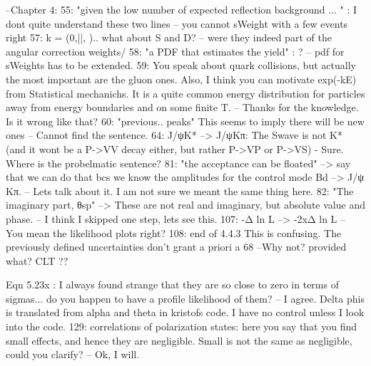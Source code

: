 --Chapter 4:
55: "given the low number of expected reflection background ... " : I dont quite understand these two lines
    -- you cannot sWeight with a few events right
57: k = (0,||, \perp).. what about S and D?
    -- were they indeed part of the angular correction weights/
58: "a PDF that estimates the yield" : ?
    -- pdf for sWeights has to be extended.
59: You speak about quark collisions, but actually the most important are the gluon ones. Also, I think you
    can motivate exp(-kE) from Statistical mechanichs. It is a quite common energy distribution for particles  away
    from energy boundaries and on some finite T.
    -- Thanks for the knowledge. Is it wrong like that?
60: "previous.. peaks" This seems to imply there will be new ones
    -- Cannot find the sentence.
64: J/ψΚ* --> J/ψΚπ: The Swave is not K* (and it wont be a P->VV decay either, but rather P->VP or P->VS)
    - Sure. Where is the probelmatic sentence?
81: "the acceptance can be floated" --> say that we can do that bcs we know the amplitudes for the control mode Bd --> J/ψ Κπ.
    -- Lets talk about it. I am not sure we meant the same thing here.
82: "The imaginary part, θsp" --> These are not real and imaginary, but absolute value and phase.
    -- I think I skipped one step, lets see this.
107: -Δ ln L --> -2xΔ ln L
    -- You mean the likelihood plots right?
108:  end of 4.4.3 This is confusing. The previously defined uncertainties don't grant a priori a 68%
    --Why not? provided what? CLT ??

Eqn 5.23x : I always found strange that they are so close to zero in terms of sigmas... do you happen to
have a profile likelihood of them?
     -- I agree. Delta phis is translated from alpha and theta in kristofs code. I have no control unless I look into the code.
129: correlations of polarization states: here you say that you find small effects, and hence they are
negligible. Small is not the same as negligible, could you clarify?
   --  Ok, I will.
